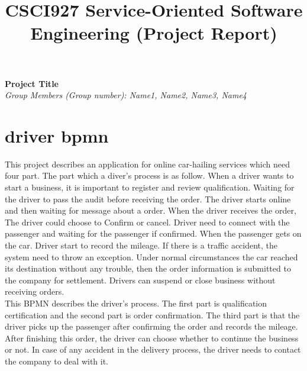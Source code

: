 \documentclass[runningheads]{llncs}
\begin{document}
\title{\large{CSCI927 Service-Oriented Software Engineering (Project Report)}}
\author{}
\institute{}
\maketitle
\vspace{-1cm}



\begin{center}
\Large{\textbf{Project Title}} \\ %
\vspace{0.2cm}
\large{\emph{Group Members (Group number): Name1, Name2, Name3, Name4}} \\%
\vspace{0.3cm}
\end{center}

\noindent 
\section{driver bpmn}
This project describes an application for online car-hailing services which need four part. The part which a diver’s process is as follow. When a driver wants to start a business, it is important to register and review qualification. Waiting for the driver to pass the audit before receiving the order. The driver starts online and then waiting for message about a order. When the driver receives the order, The driver could choose to Confirm or cancel. Driver need to connect with the passenger and waiting for the passenger if confirmed. When the passenger gets on the car. Driver start to record the mileage. If there is a traffic accident, the system need to throw an exception. Under normal circumstances the car reached its destination without any trouble, then the order information is submitted to the company for settlement. Drivers can suspend or close business without receiving orders.\\

This BPMN describes the driver's process. The first part is qualification certification and the second part is order confirmation. The third part is that the driver picks up the passenger after confirming the order and records the mileage. After finishing this order, the driver can choose whether to continue the business or not. In case of any accident in the delivery process, the driver needs to contact the company to deal with it.
\end{document}
